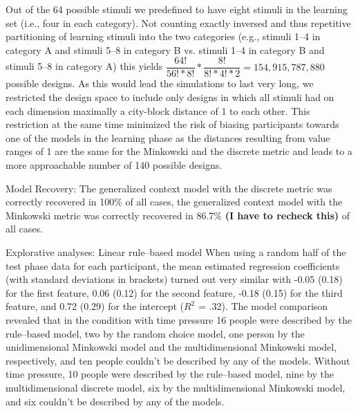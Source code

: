 Out of the 64 possible stimuli we predefined to have eight stimuli in the learning set (i.e., four in each category). Not counting exactly inversed and thus repetitive partitioning of learning stimuli into the two categories (e.g., stimuli 1--4 in category A and stimuli 5--8 in category B vs. stimuli 1--4 in category B and stimuli 5--8 in category A) this yields $\dfrac{64!}{56!*8!}*\dfrac{8!}{8!*4!*2} = 154,915,787,880$ possible designs. As this would lead the simulations to last very long, we restricted the design space to include only designs in which all stimuli had on each dimension maximally a city-block distance of 1 to each other. This restriction at the same time minimized the risk of biasing participants towards one of the models in the learning phase as the distances resulting from value ranges of 1 are the same for the Minkowski and the discrete metric and leads to a more approachable number of 140 possible designs.

Model Recovery:
The generalized context model with the discrete metric was correctly recovered in 100\% of all cases, the generalized context model with the Minkowski metric was correctly recovered in 86.7\% \textbf{(I have to recheck this)} of all cases. 

Explorative analyses: Linear rule--based model
When using a random half of the test phase data for each participant, the mean estimated regression coefficients (with standard deviations in brackets) turned out very similar with -0.05 (0.18) for the first feature, 0.06 (0.12) for the second feature, -0.18 (0.15) for the third feature, and 0.72 (0.29) for the intercept ($R^2$ = .32). The model comparison revealed that in the condition with time pressure 16 people were described by the rule--based model, two by the random choice model, one person by the unidimensional Minkowski model and the multidimensional Minkowski model, respectively, and ten people couldn't be described by any of the models. Without time pressure, 10 people were described by the rule--based model, nine by the multidimensional discrete model, six by the multidimensional Minkowski model, and six couldn't be described by any of the models. 
